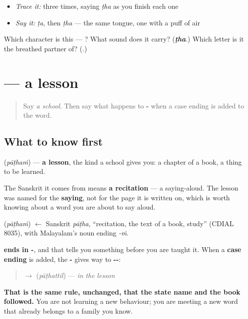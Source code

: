 \begin{itemize}
\raggedright
  \item \emph{Trace it:}  three times, saying \emph{ṭha} as you finish each one
  \item \emph{Say it:} \emph{ṭa}, then \emph{ṭha} — the same tongue, one with a puff of air
\end{itemize}

\begin{tcolorbox}[breakable,colback=teal!4,colframe=teal!35!black,title={Before you move on}]
Which character is this — ? What sound does it carry? (\emph{\textbf{ṭha}}.) Which letter is it the breathed partner of? (\textbf{}.)
\end{tcolorbox}
\section[\texorpdfstring{\ml{പാഠം} (pāṭhaṁ)}{പാഠം (pāṭhaṁ)}]{ — a lesson}

\label{lesson:ML-C103-paadam}



\begin{quote}
Say \emph{a school}. Then say what happens to \textbf{-} when a case ending is added to the word.
\end{quote}

\subsection*{What to know first}
\textbf{} (\emph{pāṭhaṁ}) — \textbf{a lesson}, the kind a school gives you: a chapter of a book, a thing to be learned.

The Sanskrit it comes from means \textbf{a recitation} — a saying-aloud. The lesson was named for the \textbf{saying}, not for the page it is written on, which is worth knowing about a word you are about to say aloud.

\begin{cousinweb}
\textbf{} (\emph{pāṭhaṁ}) $\leftarrow$ Sanskrit \emph{pāṭha}, \textquotedblleft{}recitation, the text of a book, study\textquotedblright{} (CDIAL 8035), with Malayalam's noun ending \emph{-ṁ}.
\end{cousinweb}

\begin{grammarlens}[title={Grammar Lens: you already know what it will do}]
\textbf{ ends in -}, and that tells you something before you are taught it. When a \textbf{case ending} is added, the \textbf{-} gives way to \textbf{--}:

\begin{quote}
\textbf{} $\to$ \textbf{} (\emph{pāṭhattil}) — \emph{in the lesson}
\end{quote}

\textbf{That is the same rule, unchanged, that the state name and the book followed.} You are not learning a new behaviour; you are meeting a new word that already belongs to a family you know.
\end{grammarlens}


